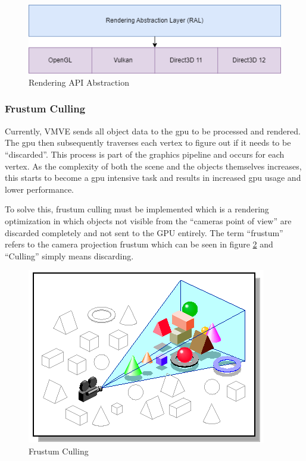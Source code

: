 \documentclass[11pt]{article}
\begin{document}
\begin{figure}[H]
  \centering
  \includegraphics[width=\textwidth]{images/api_abstraction.png}
  \caption{Rendering API Abstraction}
  \label{fig:api_abstraction}
\end{figure}

\subsubsection{Frustum Culling}
Currently, VMVE sends all object data to the \gls*{gpu} to be processed and
rendered. The \gls*{gpu} then subsequently traverses each vertex to figure out if
it needs to be ``discarded''. This process is part of the graphics pipeline and
occurs for each vertex. As the complexity of both the scene and the objects
themselves increases, this starts to become a \gls*{gpu} intensive task and
results in increased \gls*{gpu} usage and lower performance.

To solve this, frustum culling must be implemented which is a rendering
optimization in which objects not visible from the ``cameras point of view'' are
discarded completely and not sent to the GPU entirely. The term ``frustum'' refers
to the camera projection frustum which can be seen in figure
\ref{fig:frustum_culling} and ``Culling'' simply means discarding.

\begin{figure}[H]
  \centering
  \includegraphics[width=\textwidth]{images/frustum_culling.png}
  \caption{Frustum Culling \cite{frustum_culling}}
  \label{fig:frustum_culling}
\end{figure}
\end{document}
